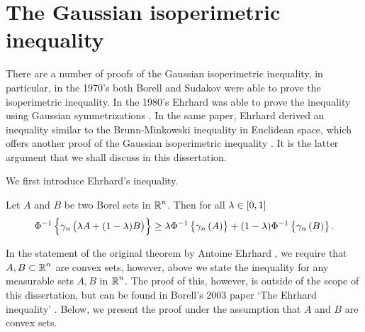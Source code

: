 \documentclass[../main.tex]{subfiles}
\begin{document}
\section{The Gaussian isoperimetric inequality}
There are a number of proofs of the Gaussian isoperimetric inequality, in particular, in the 1970's both Borell \cite{Borell1975} and Sudakov \cite{Sudakov1974} were able to prove the isoperimetric inequality. In the 1980's Ehrhard was able to prove the inequality using Gaussian symmetrizations \cite{Ehrhard1983}. In the same paper, Ehrhard derived an inequality similar to the Brunn-Minkowski inequality in Euclidean space, which offers another proof of the Gaussian isoperimetric inequality \cite{Latala2002}. It is the latter argument that we shall discuss in this dissertation.

We first introduce Ehrhard's inequality.
\begin{theorem}
\label{the:ehrhards_inequality}
Let $A$ and $B$ be two Borel sets in $\operatorname{\mathbb{R}}^n$. Then for all $\lambda\in\intcc{0,1}$
\begin{equation}
\label{eq:ehrhard}
    \Phi^{-1}\cbr{\gamma_n\del{\lambda A + (1-\lambda)B}}\geq\lambda\Phi^{-1}\cbr{\gamma_n\del{A}} + (1-\lambda)\Phi^{-1}\cbr{\gamma_n\del{B}}.
\end{equation}
\end{theorem}
In the statement of the original theorem by Antoine Ehrhard \cite{Ehrhard1983}, we require that $A,B\subset\operatorname{\mathbb{R}}^n$ are convex sets, however, above we state the inequality for any measurable sets $A,B$ in $\operatorname{\mathbb{R}}^n$. The proof of this, however, is outside of the scope of this dissertation, but can be found in Borell's 2003 paper `The Ehrhard inequality' \cite{Borell2003}. Below, we present the proof under the assumption that $A$ and $B$ are convex sets.
\end{document}
